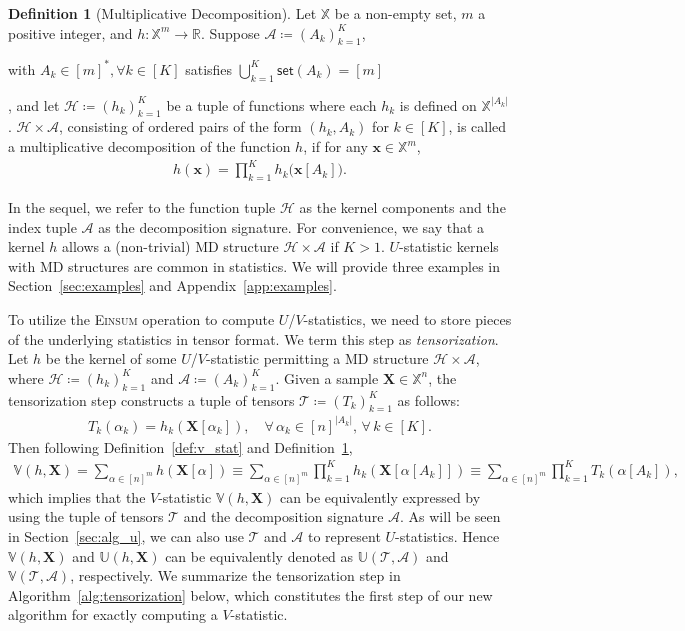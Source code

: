 \documentclass[sn-mathphys, natbib=false]{sn-jnl}
\theoremstyle{plain}
\theoremstyle{definition}
\newtheorem{definition}{Definition}
\def\Einsum{\textsc{Einsum}}
\newcommand{\ustat}{\mathbb{U}}
\newcommand{\vstat}{\mathbb{V}}
\newcommand{\samplespace}{\bbX}
\newcommand{\takesetp}[1]{\mathsf{set}(#1)}
\newif\ifshowchanges
\newcommand{\rev}[1]{%
  \ifshowchanges
    {\color{red} #1}%
  \else
    #1%
  \fi
}
\newcommand{\bbR}{{\mathbb{R}}}
\def\bbX{\mathbb{X}}
\def\calA{\mathcal{A}}
\def\calT{\mathcal{T}}
\def\calH{\mathcal{H}}
\begin{document}
\begin{bibunit}[agsm]
\begin{definition}[Multiplicative Decomposition]\label{def:mul_decomp}
Let $\samplespace$ be a non-empty set, $m$ a positive integer, and $h: \samplespace^m \to \bbR$. Suppose $\calA \coloneqq (A_k)_{k=1}^K$, \rev{ with $A_k \in [m]^{*}, \forall k \in [K]$ satisfies $\bigcup_{k=1}^K \takesetp{A_k} = [m]$ }, and let $\calH \coloneqq (h_k)_{k=1}^K$ be a tuple of functions where each $h_k$ is defined on $\samplespace^{|A_k|}$. $\calH \times \calA$, consisting of ordered pairs of the form $(h_{k}, A_{k})$ for $k \in [K]$, is called a multiplicative decomposition of the function $h$, if for any $\bm{x} \in \samplespace^m$, 
\begin{align*}
h(\bm{x}) = \prod_{k=1}^K h_k\big(\bm{x}[A_k]\big).
\end{align*}
\end{definition}
In the sequel, we refer to the function tuple $\calH$ as the kernel components and the index tuple $\calA$ as the decomposition signature. For convenience, we say that a kernel $h$ allows a (non-trivial) MD structure $\calH \times \calA$ if $K > 1$. $U$-statistic kernels with MD structures are common in statistics. We will provide three examples in Section~\ref{sec:examples} and Appendix~\ref{app:examples}.

To utilize the \Einsum{} operation to compute $U$/$V$-statistics, we need to store pieces of the underlying statistics in tensor format. We term this step as \emph{tensorization}. Let $h$ be the kernel of some $U$/$V$-statistic permitting a MD structure $\calH \times \calA$, where $\calH \coloneqq (h_k)_{k=1}^K$ and $\calA \coloneqq (A_k)^K_{k=1}$. Given a sample $\bm{X} \in \samplespace^n$, the tensorization step constructs a tuple of tensors $\calT \coloneqq (T_k)_{k=1}^K$ as follows:
\begin{align*}
T_k (\alpha_k) = h_k (\bm{X}[\alpha_k]), \quad \forall \, \alpha_k \in [n]^{|A_k|}, \, \forall \, k \in [K].
\end{align*}
Then following Definition~\ref{def:v_stat} and Definition~\ref{def:mul_decomp},
\begin{align}\label{eq:tensorization_v}
\vstat(h, \bm{X}) = \sum_{\alpha \in [n]^m} h(\bm{X}[\alpha]) \equiv \sum_{\alpha \in [n]^m} \prod_{k=1}^K h_k(\bm{X}[\alpha[A_k]]) \equiv \sum_{\alpha \in [n]^m} \prod_{k=1}^K T_k(\alpha[A_k]), 
\end{align}
which implies that the $V$-statistic $\vstat(h, \bm{X})$ can be equivalently expressed by using the tuple of tensors $\calT$ and the decomposition signature $\calA$. As will be seen in Section~\ref{sec:alg_u}, we can also use $\calT$ and $\calA$ to represent $U$-statistics. Hence $\vstat(h, \bm{X})$ and $\ustat(h, \bm{X})$ can be equivalently denoted as $\ustat(\calT, \calA)$ and $\vstat(\calT, \calA)$, respectively. We summarize the tensorization step in Algorithm~\ref{alg:tensorization} below, which constitutes the first step of our new algorithm for exactly computing a $V$-statistic.


\end{bibunit}
\end{document}
